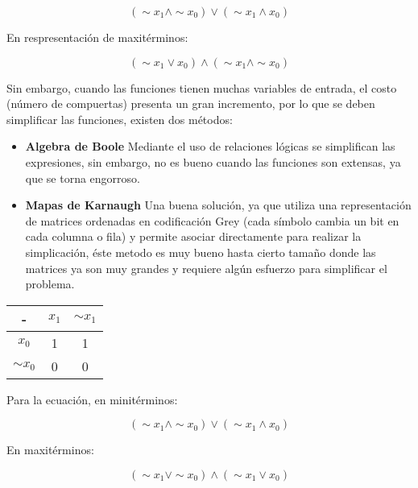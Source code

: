 \documentclass[a4paper]{article}
\begin{document}
\begin{equation}
	(\sim{x_1} \wedge \sim{x_0}) \vee (\sim{x_1} \wedge x_0)
\end{equation}

En respresentación de maxitérminos:

\begin{equation}
	(\sim{x_1} \vee x_0) \wedge (\sim{x_1} \wedge \sim{x_0})
\end{equation}

Sin embargo, cuando las funciones tienen muchas variables de entrada, el costo (número de compuertas) presenta un gran incremento, por lo que se deben simplificar las funciones, existen dos métodos:

\begin{itemize}
	\item \textbf{Algebra de Boole} Mediante el uso de relaciones lógicas se simplifican las expresiones, sin embargo, no es bueno cuando las funciones son extensas, ya que se torna engorroso.
	\item \textbf{Mapas de Karnaugh} Una buena solución, ya que utiliza una representación de matrices ordenadas en codificación Grey (cada símbolo cambia un bit en cada columna o fila) y permite asociar directamente para realizar la simplicación, éste metodo es muy bueno hasta cierto tamaño donde las matrices ya son muy grandes y requiere algún esfuerzo para simplificar el problema.
\end{itemize}

\begin{table}[H]
	\centering
	\begin{tabular}{|c | c | c|}
		\hline
		- &$x_1$ & $\sim{x_1}$\\
		\hline
		$x_0$ & 1 & 1\\
		\hline
		$\sim{x_0}$ & 0& 0\\
		\hline
	\end{tabular}
\end{table}

Para la ecuación, en minitérminos:

\begin{equation}
	(\sim{x_1} \wedge \sim{x_0}) \vee (\sim{x_1} \wedge x_0)
\end{equation}

En maxitérminos:

\begin{equation}
	(\sim{x_1} \vee \sim{x_0}) \wedge (\sim{x_1} \vee x_0)
\end{equation}
\end{document}
